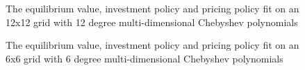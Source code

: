 \documentclass[12pt]{article}
\begin{document}
\begin{figure}[H]
  \centering
  \caption{The equilibrium value, investment policy and pricing policy fit on an 12x12 grid with 12 degree multi-dimensional Chebyshev polynomials}
\end{figure}

\begin{figure}[H]
  \centering
  \caption{The equilibrium value, investment policy and pricing policy fit on an 6x6 grid with 6 degree multi-dimensional Chebyshev polynomials}
\end{figure}
\end{document}
